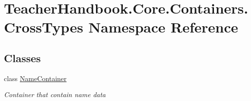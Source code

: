 \hypertarget{namespace_teacher_handbook_1_1_core_1_1_containers_1_1_cross_types}{}\section{Teacher\+Handbook.\+Core.\+Containers.\+Cross\+Types Namespace Reference}
\label{namespace_teacher_handbook_1_1_core_1_1_containers_1_1_cross_types}
\subsection*{Classes}
\begin{DoxyCompactItemize}
\item 
class \mbox{\hyperlink{class_teacher_handbook_1_1_core_1_1_containers_1_1_cross_types_1_1_name_container}{Name\+Container}}
\begin{DoxyCompactList}\small\item\em Container that contain name data \end{DoxyCompactList}\end{DoxyCompactItemize}
